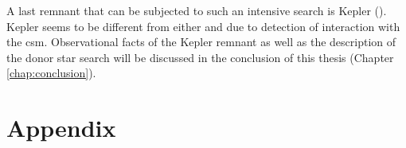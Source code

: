 A last remnant that can be subjected to such an intensive search is Kepler (). Kepler seems to be different from either  and  due to detection of interaction with the \gls{csm}. Observational facts of the Kepler remnant  as well as the description of the donor star search will be discussed in the conclusion of this thesis (Chapter \ref{chap:conclusion}).


\newpage
\section{Appendix}



\newpage

